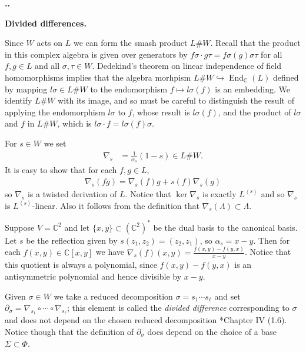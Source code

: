 \documentclass[11pt,fleqn]{amsart}
\renewcommand\thesection{\arabic{section}}
\newcounter{para}[section]
\renewcommand\thepara{\thesection.\arabic{para}}
\def\paragraph{%
 \noindent
 \refstepcounter{para}%
 \textbf{\thepara.}\hspace{1ex}%
}
\newcommand\about[1]{%
 {\bfseries#1.}%
}
\newcommand\CC{\mathbb C}
\newcommand\vectspan[1]{\left\langle #1 \right\rangle}
\DeclareMathOperator\End{End}
\begin{document}
\paragraph
\about{Divided differences}
Since $W$ acts on $L$ we can form the smash product $L \# W$. Recall that the 
product in this complex algebra is given over generators by $f \sigma \cdot g 
\tau = f \sigma(g) \sigma \tau$ for all $f, g \in L$ and all $\sigma, \tau 
\in W$. Dedekind's theorem on linear independence of field homomorphisms 
implies that the algebra morhpism $L \# W \hookrightarrow \End_\CC(L)$ defined 
by mapping $l \sigma \in L \# W$ to the endomorphism $f \mapsto l\sigma(f)$ is
an embedding. We identify $L\# W$ with its image, and so must be careful to 
distinguish the result of applying the endomorphism $l \sigma$ to $f$, whose
result is $l\sigma(f)$, and the product of $l \sigma$ and $f$ in $L \# W$, 
which is $l \sigma \cdot f = l\sigma(f) \sigma$. 

For $s\in W$ we set
\begin{align*}
\nabla_s 
	&= \frac{1}{\alpha_s}(1-s) \in L \# W.
\end{align*}
It is easy to show that for each $f, g \in L$,
\begin{align*}
\nabla_s(fg) = \nabla_s(f) g + s(f)\nabla_s(g)
\end{align*}
so $\nabla_s$ is a twisted 
derivation of $L$. Notice that $\ker \nabla_s$ is exactly $L^{\vectspan s}$ 
and so $\nabla_s$ is $L^{\vectspan s}$-linear. Also it follows from the
definition that $\nabla_s(\Lambda) \subset \Lambda$. 

\begin{Example*}
Suppose $V = \CC^2$ and let $\{x,y\} \subset (\CC^2)^*$ be the dual basis
to the canonical basis. Let $s$ be the reflection given by $s(z_1, z_2) = (z_2,
z_1)$, so $\alpha_s = x -y$. Then for each $f(x,y) \in \CC[x,y]$ we have
$\nabla_s (f)(x,y) = \frac{f(x,y) - f(y,x)}{x-y}$. Notice that this quotient is
always a polynomial, since $f(x,y) - f(y,x)$ is an antisymmetric polynomial and
hence divisible by $x-y$.
\end{Example*}

Given $\sigma \in W$ we take a reduced decomposition $\sigma = s_1 \cdots 
s_{\ell}$ and set $\partial_\sigma = \nabla_{s_1} \circ \cdots \circ 
\nabla_{s_\ell}$; this element is called the \emph{divided difference} 
corresponding to $\sigma$ and does not depend on the chosen reduced 
decomposition \cite{Hiller-coxeter-book}*{Chapter IV (1.6)}. Notice though that
the definition of $\partial_\sigma$ does depend on the choice of a base 
$\Sigma \subset \Phi$. 
\end{document}
